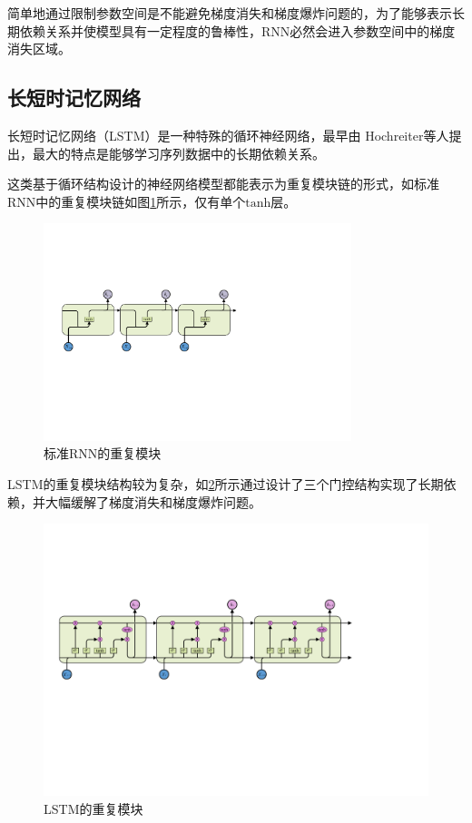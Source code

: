 \documentclass[master]{thesis-uestc}
\begin{document}
简单地通过限制参数空间是不能避免梯度消失和梯度爆炸问题的，为了能够表示长期依赖关系并使模型具有一定程度的鲁棒性，RNN必然会进入参数空间中的梯度消失区域。

\subsection{长短时记忆网络}
长短时记忆网络（LSTM）是一种特殊的循环神经网络，最早由
Hochreiter等人提出，最大的特点是能够学习序列数据中的长期依赖关系。

这类基于循环结构设计的神经网络模型都能表示为重复模块链的形式，如标准RNN中的重复模块链如图\ref{Figure.2.3}所示，仅有单个$\mathrm{tanh}$层。
\begin{figure}[!ht]
\centering 
\includegraphics[width=0.8\textwidth]{./pic/SimpleRNN.pdf}
\caption{标准RNN的重复模块}
\label{Figure.2.3}
\end{figure}

LSTM的重复模块结构较为复杂，如\ref{Figure.2.4}所示通过设计了三个门控结构实现了长期依赖，并大幅缓解了梯度消失和梯度爆炸问题。
\begin{figure}[!ht]
\centering 
\includegraphics[width=1.0\textwidth]{./pic/LSTM1.pdf}
\caption{LSTM的重复模块}
\label{Figure.2.4}
\end{figure}
\end{document}
